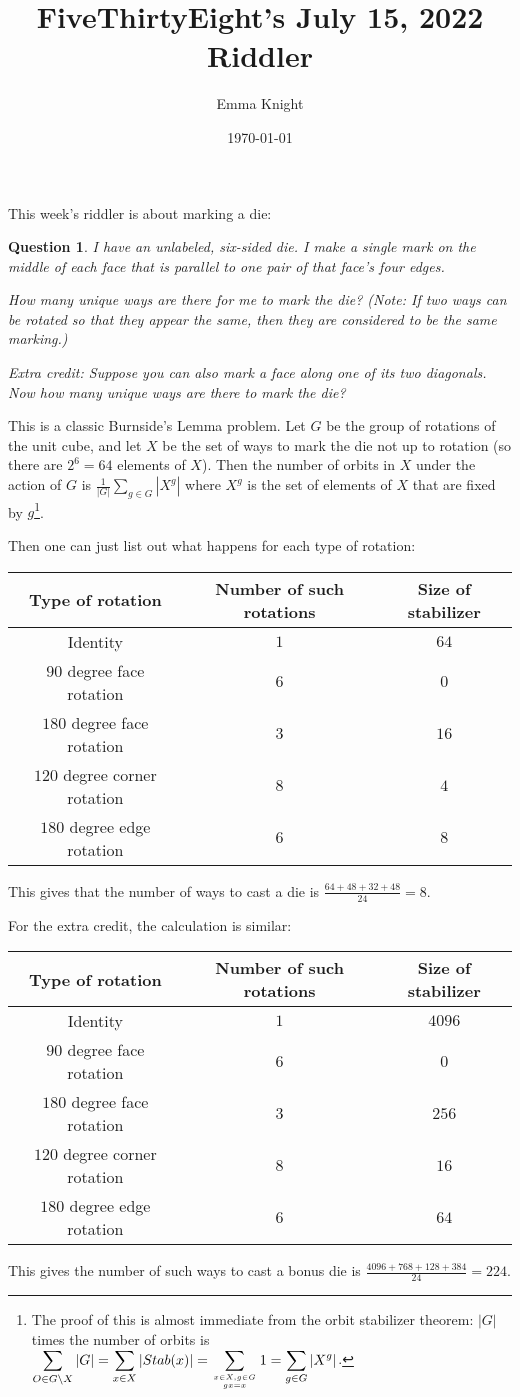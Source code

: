 \documentclass[11pt]{article}
\title{FiveThirtyEight's July 15, 2022 Riddler}
\author{Emma Knight}
\date{\today}
\newtheorem{question}[theorem]{Question}
\theoremstyle{definition}
\begin{document}
\maketitle
This week's riddler is about marking a die:
\begin{question}
I have an unlabeled, six-sided die. I make a single mark on the middle of each face that is parallel to one pair of that face’s four edges.

How many unique ways are there for me to mark the die? (Note: If two ways can be rotated so that they appear the same, then they are considered to be the same marking.)

\emph{Extra credit}: Suppose you can also mark a face along one of its two diagonals. Now how many unique ways are there to mark the die?
\end{question}

This is a classic Burnside's Lemma problem.  Let $G$ be the group of rotations of the unit cube, and let $X$ be the set of ways to mark the die not up to rotation (so there are $2^6 = 64$ elements of $X$).  Then the number of orbits in $X$ under the action of $G$ is $\displaystyle{\frac{1}{|G|}\sum_{g \in G}|X^g|}$ where $X^g$ is the set of elements of $X$ that are fixed by $g$\footnote{The proof of this is almost immediate from the orbit stabilizer theorem: $|G|$ times the number of orbits is $\displaystyle{\sum_{O \in G\backslash X} |G| = \sum_{x \in X} |Stab(x)| = \sum_{x \in X, g \in G \atop gx = x} 1 = \sum_{g \in G} |X^g|}$.}.

Then one can just list out what happens for each type of rotation:

\begin{tabular}{c|c|c}
Type of rotation & Number of such rotations & Size of stabilizer \\ \hline \hline 
Identity & $1$ & $64$  \\\hline 
$90$ degree face rotation & $6$ & $0$ \\ \hline
$180$ degree face rotation & $3$ & $16$ \\ \hline
$120$ degree corner rotation & $8$ & $4$ \\ \hline
$180$ degree edge rotation & $6$ & $8$
\end{tabular}

This gives that the number of ways to cast a die is $\frac{64+48 + 32 + 48}{24} = 8$.

For the extra credit, the calculation is similar:

\begin{tabular}{c|c|c}
Type of rotation & Number of such rotations & Size of stabilizer \\ \hline \hline 
Identity & $1$ & $4096$  \\\hline 
$90$ degree face rotation & $6$ & $0$ \\ \hline
$180$ degree face rotation & $3$ & $256$ \\ \hline
$120$ degree corner rotation & $8$ & $16$ \\ \hline
$180$ degree edge rotation & $6$ & $64$
\end{tabular}

This gives the number of such ways to cast a bonus die is $\frac{4096 + 768 + 128 + 384}{24} = 224$.
\end{document}
